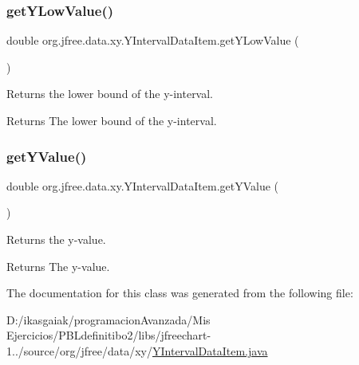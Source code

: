 \subsubsection{\texorpdfstring{get\+Y\+Low\+Value()}{getYLowValue()}}
{\footnotesize\ttfamily double org.\+jfree.\+data.\+xy.\+Y\+Interval\+Data\+Item.\+get\+Y\+Low\+Value (\begin{DoxyParamCaption}{ }\end{DoxyParamCaption})}

Returns the lower bound of the y-\/interval.

\begin{DoxyReturn}{Returns}
The lower bound of the y-\/interval. 
\end{DoxyReturn}
\mbox{\label{classorg_1_1jfree_1_1data_1_1xy_1_1_y_interval_data_item_ae16eeb27b834abd3cf0e11abc4f3deee}} 
\subsubsection{\texorpdfstring{get\+Y\+Value()}{getYValue()}}
{\footnotesize\ttfamily double org.\+jfree.\+data.\+xy.\+Y\+Interval\+Data\+Item.\+get\+Y\+Value (\begin{DoxyParamCaption}{ }\end{DoxyParamCaption})}

Returns the y-\/value.

\begin{DoxyReturn}{Returns}
The y-\/value. 
\end{DoxyReturn}


The documentation for this class was generated from the following file\+:\begin{DoxyCompactItemize}
\item 
D\+:/ikasgaiak/programacion\+Avanzada/\+Mis Ejercicios/\+P\+B\+Ldefinitibo2/libs/jfreechart-\/1../source/org/jfree/data/xy/\mbox{\hyperlink{_y_interval_data_item_8java}{Y\+Interval\+Data\+Item.\+java}}\end{DoxyCompactItemize}
